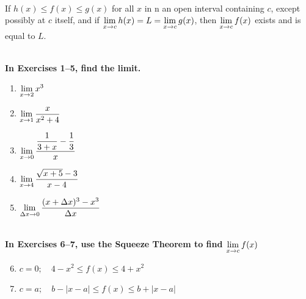 \begin{theorem}~\\
    If $h(x)\leq f(x)\leq g(x)$ for all $x$ in n an open interval containing $c$, except possibly at $c$ itself, and if $\displaystyle\lim\limits_{x\to c}h(x)=L=\displaystyle\lim\limits_{x\to c}g(x)$, then $\displaystyle\lim\limits_{x\to c}f(x)$ exists and is equal to $L$.
    \\\cite{ci}
\end{theorem}

\begin{exercise}
    ~\\\-\hspace{0.3cm} \textbf{
        In Exercises 1–5, find the limit.
    }\cite{ci}\\
    \begin{enumerate} 
		\item $\displaystyle\lim\limits_{x\to 2} x^3$
		\item $\displaystyle\lim\limits_{x\to 1} \dfrac{x}{x^2+4}$
		\item $\displaystyle\lim\limits_{x\to 0} \dfrac{\dfrac{1}{3+x}-\dfrac{1}{3}}{x}$
		\item $\displaystyle\lim\limits_{x\to 4} \dfrac{\sqrt{x+5}-3}{x-4}$
		\item $\displaystyle\lim\limits_{\Delta x\to 0} \dfrac{(x+\Delta x)^3-x^3}{\Delta x}$
    \end{enumerate}
    ~\\\-\hspace{0.3cm} \textbf{
        In Exercises 6–7, use the Squeeze Theorem to find $\displaystyle\lim\limits_{x\to c}f(x)$ 
    }\cite{ci}\\
    \begin{enumerate}
        \setcounter{enumi}{5}
        \item $c=0;\quad 4-x^2\leq f(x)\leq 4+x^2$
        \item $c=a;\quad b-|x-a|\leq f(x)\leq b+|x-a|$
    \end{enumerate}
\end{exercise}
